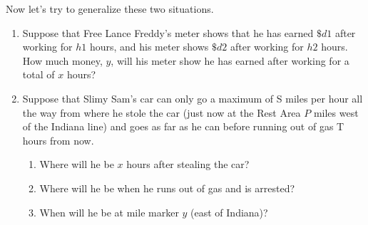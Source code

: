 \documentclass{ximera}
\begin{document}
\begin{problem}
Now let's try to generalize these two situations.
\begin{enumerate}
    \item Suppose that Free Lance Freddy's meter shows that he has earned $\$d1 $ after working for $h1$ hours, and his meter shows $\$d2 $ after working for $h2 $ hours. How much money, $y$, will his meter show he has earned after working for a total of $x$ hours?
    \item Suppose that Slimy Sam's car can only go a maximum of S miles per hour all the way from where he stole the car (just now at the Rest Area $P$ miles west of the Indiana line) and goes as far as he can before running out of gas T hours from now.
\begin{enumerate}[label=(\roman*)]
 \item Where will he be $x$ hours after stealing the car?
 \item Where will he be when he runs out of gas and is arrested?
 \item  When will he be at mile marker $y$ (east of Indiana)?
\end{enumerate}

\end{enumerate}



\end{problem}
\end{document}
